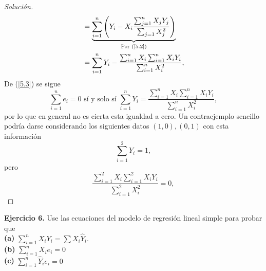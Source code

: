 \documentclass[10.5pt,notitlepage]{article}
\newenvironment{solucion}
  {\begin{proof}[Solución]}
  {\end{proof}}
\newcommand{\pare}[1]{\left( #1 \right)}
\begin{document}
\begin{solucion}
\begin{align}
                        &= \underbrace{ \sum_{i = 1}^{n}\pare{ Y_i - X_i\frac{\sum_{j=1}^{n}X_jY_j}{\sum_{j=1}X_{j}^2}}}_{\text{Por (\ref{5.2})}}\nonumber\\ 
                        &= \sum_{i=1}^n Y_i - \frac{\sum_{i=1}^{n}X_i \sum_{i=1}^{n}X_iY_i}{\sum_{i=1}^{n}X_{i}^2},\label{5.3}
\end{align}                       
De (\ref{5.3}) se sigue 
\[
\sum_{i = 1}^{n}e_i = 0 \text{ sí y solo sí }  \sum_{i=1}^n Y_i = \frac{\sum_{i=1}^{n}X_i \sum_{i=1}^{n}X_iY_i}{\sum_{i=1}^{n}X_{i}^2},
\]
por lo que en general no es cierta esta igualdad a cero. Un contraejemplo sencillo podría darse considerando los siguientes datos \((1,0),(0,1)\) con esta información 
 \[
 \sum_{i=1}^{2}Y_i =1, 
 \]
 pero
 \[
 \frac{\sum_{i=1}^{2}X_i \sum_{i=1}^{2}X_iY_i}{\sum_{i=1}^{2}X_{i}^2} = 0,
 \]

\end{solucion}
\noindent \textbf{Ejercicio 6.} Use las ecuaciones del modelo de regresión lineal simple para probar que\\ 

\noindent \textbf{(a)} \(\sum_{i=1}^{n}X_i Y_i = \sum X_i \hat{Y}_i.\)\\
\noindent \textbf{(b)} \(\sum_{i=1}^{n}X_i e_i = 0\)\\
\noindent \textbf{(c)} \(\sum_{i=1}^{n}\hat{Y}_i e_i = 0\)
\end{document}
